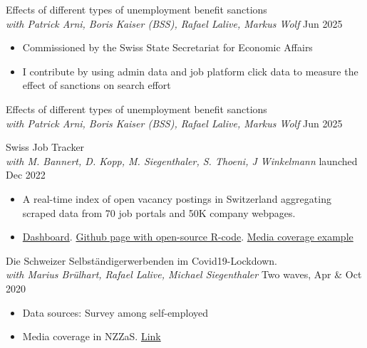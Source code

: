 \documentclass[letter, 11pt]{res}
\begin{document}
\begin{resume}
\begin{itemize}[topsep=0pt]
\end{itemize}

Effects of different types of unemployment benefit sanctions\\
{\sl with Patrick Arni, Boris Kaiser (BSS), Rafael Lalive, Markus Wolf} \hfill Jun 2025
\begin{itemize}[topsep=0pt]
\item [--] Commissioned by the  Swiss State Secretariat for Economic Affairs
\item [--] I contribute by using admin data and job platform click data to measure the effect of sanctions on search effort
\end{itemize}

Effects of different types of unemployment benefit sanctions\\
{\sl with Patrick Arni, Boris Kaiser (BSS), Rafael Lalive, Markus Wolf} \hfill Jun 2025

Swiss Job Tracker\\
{\sl with M. Bannert, D. Kopp, M. Siegenthaler, S. Thoeni, J Winkelmann} \hfill launched Dec 2022
\begin{itemize}[topsep=0pt]
\item [--] A real-time index of open vacancy postings in Switzerland aggregating scraped data from 70 job portals and 50K company webpages. 
\item [--] \href{http://swissjobtracker.ch}{Dashboard}. \href{https://github.com/swissjobtracker/chjobtracker}{Github page with open-source R-code}. \href{https://shorturl.at/aEKTV}{Media coverage example}
\end{itemize}

Die Schweizer Selbständigerwerbenden im Covid19-Lockdown. \\
{\sl with Marius Brülhart, Rafael Lalive, Michael Siegenthaler} \hfill Two waves, Apr \& Oct 2020
\begin{itemize}[topsep=0pt]
\item [--] Data sources: Survey among self-employed
\item [--] Media coverage in NZZaS. \href{https://magazin.nzz.ch/wirtschaft/zweite-welle-viele-selbstaendige-fuerchten-um-ihre-existenz-ld.1589295?reduced=true}{Link}
\end{itemize}


\end{resume}
\end{document}
